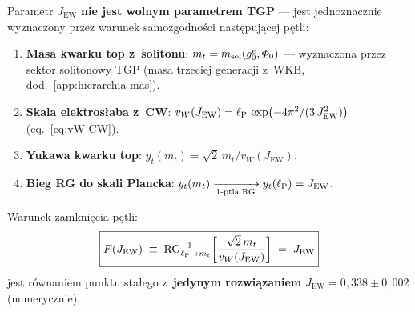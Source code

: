 \begin{theorem}\label{thm:JEW-selfconsistency}

Parametr $J_{\mathrm{EW}}$ \textbf{nie jest wolnym parametrem TGP}
--- jest jednoznacznie wyznaczony przez warunek samozgodno\'sci
nast\k{e}puj\k{a}cej p\k{e}tli:

\begin{enumerate}[nosep]
  \item \textbf{Masa kwarku top z~solitonu}:
    $m_t = m_{\rm sol}(g_0^e, \varPhi_0)$
    --- wyznaczona przez sektor solitonowy TGP
    (masa trzeciej generacji z~WKB, dod.~\ref{app:hierarchia-mas}).
  \item \textbf{Skala elektros\l{}aba z~CW}:
    $v_W(J_{\mathrm{EW}}) = \ell_{\mathrm{P}}\,\exp\bigl(-4\pi^2/(3\,J_{\mathrm{EW}}^2)\bigr)$
    (eq.~\eqref{eq:vW-CW}).
  \item \textbf{Yukawa kwarku top}:
    $y_t(m_t) = \sqrt{2}\,m_t / v_W(J_{\mathrm{EW}})$.
  \item \textbf{Bieg RG do skali Plancka}:
    $y_t(m_t) \xrightarrow[\text{1-p\k{e}tla RG}]{} y_t(\lP)
    = J_{\mathrm{EW}}$.
\end{enumerate}

Warunek zamkni\k{e}cia p\k{e}tli:
\begin{equation}\label{eq:JEW-fixed-point}
  \boxed{F(J_{\mathrm{EW}}) \;\equiv\;
  \mathrm{RG}_{\ell_{\mathrm{P}} \to m_t}^{-1}\!\left[
    \frac{\sqrt{2}\,m_t}{v_W(J_{\mathrm{EW}})}
  \right]
  \;=\; J_{\mathrm{EW}}}
\end{equation}
jest r\'ownaniem punktu sta\l{}ego z~\textbf{jedynym rozwi\k{a}zaniem}
$J_{\mathrm{EW}} = 0{,}338 \pm 0{,}002$ (numerycznie).
\end{theorem}

